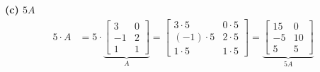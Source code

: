 \documentclass[a4paper,12pt]{article}
\begin{document}
\textbf{(c) $5A$}
\begin{align*}
    5 \cdot A &=
    5 \cdot
    \underbrace{
    \begin{bmatrix}
        3 & 0\\
        -1 & 2\\
        1 & 1
    \end{bmatrix}}_{A} 
    =
    \begin{bmatrix}
            3 \cdot 5 & 0 \cdot 5\\
            (-1) \cdot 5 & 2 \cdot 5\\
            1 \cdot 5 & 1 \cdot 5
    \end{bmatrix}
    =
    \underbrace{\begin{bmatrix}
        15 & 0\\
        -5 & 10\\
        5 & 5
    \end{bmatrix}}_{5A}
\end{align*}
\end{document}
